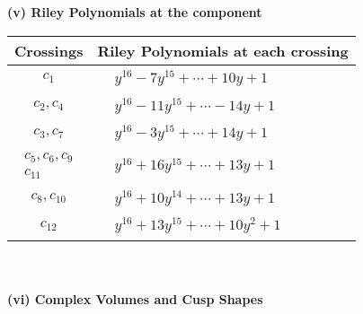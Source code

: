 \documentclass[1p]{elsarticle_modified}
\theoremstyle{definition}
\begin{document}
\newpage\renewcommand{\arraystretch}{1}
\flushleft \textbf{(v) Riley Polynomials at the component}\newline \\
\begin{tabular}{m{50pt}|m{274pt}}
Crossings & \hspace{64pt}Riley Polynomials at each crossing \\
\hline $$\begin{aligned}c_{1}\end{aligned}$$&$\begin{aligned}
&y^{16}-7 y^{15}+\cdots+10 y+1
\end{aligned}$\\
\hline $$\begin{aligned}c_{2},c_{4}\end{aligned}$$&$\begin{aligned}
&y^{16}-11 y^{15}+\cdots-14 y+1
\end{aligned}$\\
\hline $$\begin{aligned}c_{3},c_{7}\end{aligned}$$&$\begin{aligned}
&y^{16}-3 y^{15}+\cdots+14 y+1
\end{aligned}$\\
\hline $$\begin{aligned}c_{5},c_{6},c_{9}\\c_{11}\end{aligned}$$&$\begin{aligned}
&y^{16}+16 y^{15}+\cdots+13 y+1
\end{aligned}$\\
\hline $$\begin{aligned}c_{8},c_{10}\end{aligned}$$&$\begin{aligned}
&y^{16}+10 y^{14}+\cdots+13 y+1
\end{aligned}$\\
\hline $$\begin{aligned}c_{12}\end{aligned}$$&$\begin{aligned}
&y^{16}+13 y^{15}+\cdots+10 y^2+1
\end{aligned}$\\
\hline
\end{tabular}\\~\\
\newpage\flushleft \textbf{(vi) Complex Volumes and Cusp Shapes}
\end{document}
